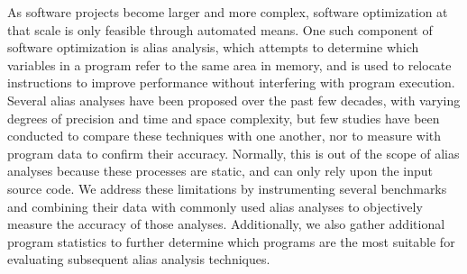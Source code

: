 As software projects become larger and more complex, software optimization at that scale is only feasible through automated means. One such component of software optimization is alias analysis, which attempts to determine which variables in a program refer to the same area in memory, and is used to relocate instructions to improve performance without interfering with program execution. Several alias analyses have been proposed over the past few decades, with varying degrees of precision and time and space complexity, but few studies have been conducted to compare these techniques with one another, nor to measure with program data to confirm their accuracy. Normally, this is out of the scope of alias analyses because these processes are static, and can only rely upon the input source code. We address these limitations by instrumenting several benchmarks and combining their data with commonly used alias analyses to objectively measure the accuracy of those analyses. Additionally, we also gather additional program statistics to further determine which programs are the most suitable for evaluating subsequent alias analysis techniques.

